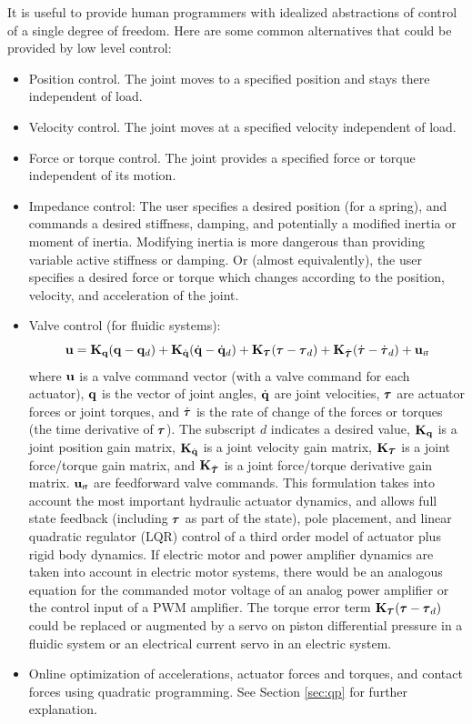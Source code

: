 \documentclass[letterpaper,12pt,fullpage]{article}
\newcommand{\ff}{{\mbox {\tiny ff}}}
\begin{document}
It is useful to provide human programmers
with idealized abstractions of control of a single degree of
freedom. Here are some common alternatives that could be provided by low level control:
\begin{itemize}
\item
Position control. The joint moves to a specified position and stays there independent
of load.
\item
Velocity control. The joint moves at a specified velocity independent of load.
\item
Force or torque control. The joint provides a specified force or torque independent
of its motion.
\item
Impedance control: The user specifies a desired position (for a spring), and commands
a desired
stiffness, damping, and potentially a modified inertia or moment of inertia.
Modifying inertia is more dangerous than providing variable active stiffness
or damping.
Or (almost equivalently),
the user specifies a desired force or torque
which changes according to the position, velocity,
and acceleration of the joint.
\item
Valve control (for fluidic systems):
\begin{equation}
\vu = \mK_{\vq} (\vq - \vq_d) + \mK_{\dot{\vq}} ( \dot{\vq} - \dot{\vq}_d )
+ \mK_{\vtau} ( \vtau - \vtau_d )
+ \mK_{\dot{\vtau}} ( \dot{\vtau} - \dot{\vtau}_d ) + \vu_{\ff}
\end{equation}
where ${\bf u}$ is a valve command vector (with a valve command for each actuator),
${\bf q}$ is the vector of joint angles, $\dot{{\bf q}}$ are joint velocities,
$\vtau$ are actuator forces or joint torques, and $\dot{\vtau}$ is the rate of change
of the forces or torques (the time derivative of $\vtau$). 
The subscript $d$ indicates a desired value,
${\bf K}_{{\bf q}}$ is a joint position gain matrix,
${\bf K}_{\dot{{\bf q}}}$ is a joint velocity gain matrix, 
$\mK_{\vtau}$ is a joint force/torque gain matrix,
and $\mK_{\dot{\vtau}}$ is a joint force/torque derivative gain matrix.
$\vu_{\ff}$ are feedforward valve commands.
This formulation takes into account the most important hydraulic actuator dynamics,
and allows full state feedback
(including $\vtau$ as part of the state), pole placement, and linear quadratic
regulator (LQR) control of
a third order model of actuator plus rigid body dynamics.
If electric motor and power amplifier dynamics are taken into account in electric
motor systems, there would be an analogous equation for the commanded
motor voltage of
an analog power amplifier or
the control input of a PWM amplifier.
The torque error term $\mK_{\vtau} ( \vtau - \vtau_d )$ could be replaced or augmented
by a servo on piston differential pressure in a fluidic system or
an electrical current servo in an electric system.
\item
Online optimization of accelerations, actuator forces and torques, and contact forces
using quadratic programming. See Section \ref{sec:qp} for further explanation.
\end{itemize} 
\end{document}
